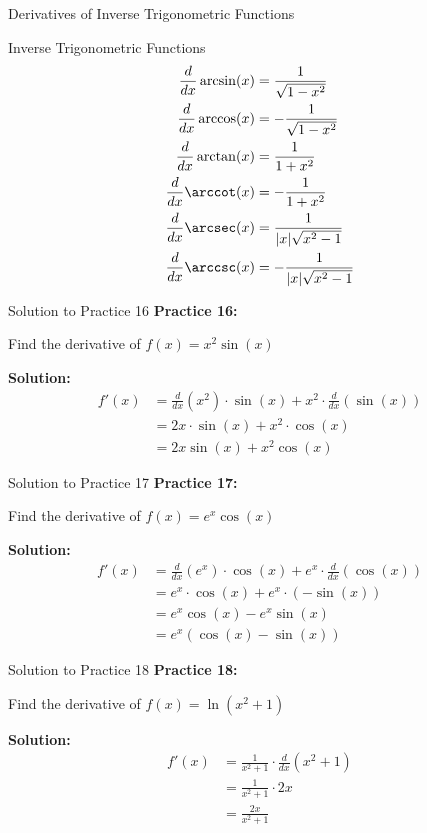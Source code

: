 \documentclass[aspectratio=169]{beamer}
\begin{document}
\begin{frame}{Derivatives of Inverse Trigonometric Functions}
\begin{block}{Inverse Trigonometric Functions}
\[
\begin{aligned}
  \frac{d}{dx} \arcsin(x) &= \frac{1}{\sqrt{1-x^2}} \\
  \frac{d}{dx} \arccos(x) &= -\frac{1}{\sqrt{1-x^2}} \\
  \frac{d}{dx} \arctan(x) &= \frac{1}{1+x^2} \\
  \frac{d}{dx} \arccot(x) &= -\frac{1}{1+x^2} \\
  \frac{d}{dx} \arcsec(x) &= \frac{1}{|x|\sqrt{x^2-1}} \\
  \frac{d}{dx} \arccsc(x) &= -\frac{1}{|x|\sqrt{x^2-1}}
\end{aligned}
\]
\end{block}
\end{frame}

\begin{frame}{Solution to Practice 16}
\textbf{Practice 16:}

Find the derivative of $f(x) = x^2 \sin(x)$

\textbf{Solution:}
\[
\begin{aligned}
  f'(x) &= \frac{d}{dx}(x^2) \cdot \sin(x) + x^2 \cdot \frac{d}{dx}(\sin(x)) \\
  &= 2x \cdot \sin(x) + x^2 \cdot \cos(x) \\
  &= 2x\sin(x) + x^2\cos(x)
\end{aligned}
\]
\end{frame}

\begin{frame}{Solution to Practice 17}
\textbf{Practice 17:}

Find the derivative of $f(x) = e^x \cos(x)$

\textbf{Solution:}
\[
\begin{aligned}
  f'(x) &= \frac{d}{dx}(e^x) \cdot \cos(x) + e^x \cdot \frac{d}{dx}(\cos(x)) \\
  &= e^x \cdot \cos(x) + e^x \cdot (-\sin(x)) \\
  &= e^x\cos(x) - e^x\sin(x) \\
  &= e^x(\cos(x) - \sin(x))
\end{aligned}
\]
\end{frame}

\begin{frame}{Solution to Practice 18}
\textbf{Practice 18:}

Find the derivative of $f(x) = \ln(x^2 + 1)$

\textbf{Solution:}
\[
\begin{aligned}
  f'(x) &= \frac{1}{x^2 + 1} \cdot \frac{d}{dx}(x^2 + 1) \\
  &= \frac{1}{x^2 + 1} \cdot 2x \\
  &= \frac{2x}{x^2 + 1}
\end{aligned}
\]
\end{frame}
\end{document}
